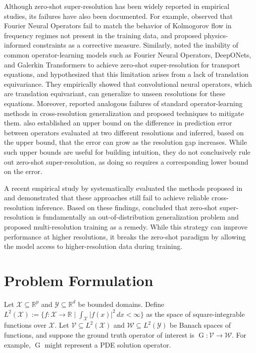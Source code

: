 \documentclass[11pt]{article}
\theoremstyle{plain}
\newcommand{\Xcal}{\mathcal{X}}
\newcommand{\Ycal}{\mathcal{Y}}
\newcommand{\Vcal}{\mathcal{V}}
\newcommand{\Wcal}{\mathcal{W}}
\begin{document}
Although zero-shot super-resolution has been widely reported in empirical studies, its failures have also been documented. For example, \cite{li2024physics} observed that Fourier Neural Operators fail to match the behavior of Kolmogorov flow in frequency regimes not present in the training data, and proposed physics-informed constraints as a corrective measure. Similarly, \cite{raonic2023convolutional} noted the inability of common operator-learning models such as Fourier Neural Operators, DeepONets, and Galerkin Transformers to achieve zero-shot super-resolution for transport equations, and hypothesized that this limitation arises from a lack of translation equivariance. They empirically showed that convolutional neural operators, which are translation equivariant, can generalize to unseen resolutions for these equations. Moreover, \cite{gao2025discretization} reported analogous failures of standard operator-learning methods in cross-resolution generalization and proposed techniques to mitigate them. \cite{gao2025discretization} also established an upper bound on the difference in prediction error between operators evaluated at two different resolutions and inferred, based on the upper bound, that the error can grow as the resolution gap increases. While such upper bounds are useful for building intuition, they do not conclusively rule out zero-shot super-resolution, as doing so requires a corresponding lower bound on the error.

A recent empirical study by \cite{sakarvadia2025false} systematically evaluated the methods proposed in \cite{li2024physics, raonic2023convolutional, gao2025discretization} and demonstrated that these approaches still fail to achieve reliable cross-resolution inference. Based on these findings, \cite{sakarvadia2025false} concluded that zero-shot super-resolution is fundamentally an out-of-distribution generalization problem and proposed multi-resolution training as a remedy. While this strategy can improve performance at higher resolutions, it breaks the zero-shot paradigm by allowing the model access to higher-resolution data during training.


\section{Problem Formulation}

Let $ \Xcal \subseteq \mathbb{R}^p $ and $ \Ycal \subseteq \mathbb{R}^d $ be bounded domains. Define $ L^2(\Xcal) := \{ f : \Xcal \to \mathbb{R} \mid \int_{\Xcal} |f(x)|^2\, dx < \infty \} $ as the space of square-integrable functions over $ \Xcal $. Let $ \Vcal \subseteq L^2(\Xcal) $ and $ \Wcal \subseteq L^2(\Ycal) $ be Banach spaces of functions, and suppose the ground truth operator of interest is $ \operatorname{G} : \Vcal \to \Wcal $. For example, $ \operatorname{G} $ might represent a PDE solution operator.
\end{document}
